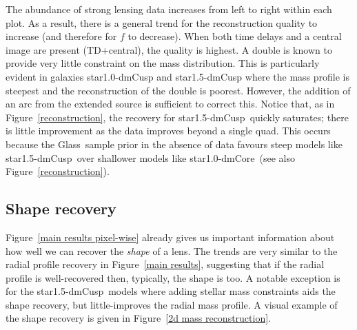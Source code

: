 \documentclass[galley,usenatbib]{mn2e}
\newcommand{\Glass}{{\sc Glass}}
\newcommand{\figref}[1] {Figure~\ref{#1}}
\newcommand{\mockAA}{{\sc star1.0-dmCore}}
\newcommand{\mockAC}{{\sc star1.0-dmCusp}}
\newcommand{\mockBC}{{\sc star1.5-dmCusp}}
\begin{document}
The abundance of strong lensing data increases from left to right within each
plot. As a result, there is a general trend for the reconstruction quality to
increase (and therefore for $f$ to decrease). When both time delays and a
central image are present (TD+central), the quality is highest. A double is known to
provide very little constraint on the mass distribution. This is particularly
evident in galaxies \mockAC{} and \mockBC{} where the mass profile is steepest
and the reconstruction of the double is poorest. However, the addition of an
arc from the extended source is sufficient to correct this. Notice that, as in
\figref{reconstruction}, the recovery for \mockBC\ quickly saturates; there is
little improvement as the data improves beyond a single quad. This occurs
because the \Glass\ sample prior in the absence of data favours steep models
like \mockBC\ over shallower models like \mockAA\ (see also
\figref{reconstruction}). 

\subsection{Shape recovery}\label{sec:shape}

\figref{main results pixel-wise} already gives us important information about
how well we can recover the {\it shape} of a lens. The trends are very similar
to the radial profile recovery in \figref{main results}, suggesting that if the
radial profile is well-recovered then, typically, the shape is too. A notable
exception is for the \mockBC\ models where adding stellar mass constraints aids
the shape recovery, but little-improves the radial mass profile. A visual
example of the shape recovery is given in \figref{2d mass reconstruction}.
\end{document}
